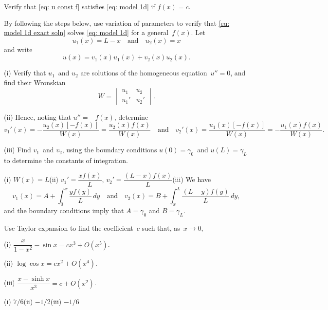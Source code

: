 \begin{example}
 
\end{example}

\begin{Exercises}

\exercise\label{ex: u const f}
Verify that \eqref{eq: u const f} satisfies \eqref{eq: model 1d} if $f(x)=c$.

\exercise\label{ex: variation of params}
By following the steps below, use variation of parameters to  verify that 
\eqref{eq: model 1d exact soln} solves \eqref{eq: model 1d} for a 
general~$f(x)$.  Let
\[
u_1(x)=L-x\quad\text{and}\quad u_2(x)=x
\]
and write
\[
u(x)=v_1(x)u_1(x)+v_2(x)u_2(x).
\]
\begin{description}
\item{(i)} Verify that $u_1$~and $u_2$ are solutions of the homogeneous 
equation~$u''=0$, and find their Wronskian
\[
W=\begin{vmatrix}u_1&u_2\\ u_1'&u_2' \end{vmatrix}.
\]
\item{(ii)} Hence, noting that $u''=-f(x)$, determine
\[
v_1'(x)=-\frac{u_2(x)[-f(x)]}{W(x)}=\frac{u_2(x)f(x)}{W(x)}
\quad\text{and}\quad
v_2'(x)=\frac{u_1(x)[-f(x)]}{W(x)}=-\frac{u_1(x)f(x)}{W(x)}.
\]
\item{(iii)}
Find $v_1$~and $v_2$, using the boundary conditions $u(0)=\gamma_0$~and 
$u(L)=\gamma_L$ to determine the constants of integration.
\end{description}
\begin{ans}
(i) $W(x)=L$\quad (ii) $v_1'=\dfrac{xf(x)}{L}$, 
$v_2'=\dfrac{(L-x)f(x)}{L}$\quad (iii) We have
\[
v_1(x)=A+\int_0^x\frac{yf(y)}{L}\,dy
\quad\text{and}\quad
v_2(x)=B+\int_x^L\frac{(L-y)f(y)}{L}\,dy,
\]
and the boundary conditions imply that $A=\gamma_0$ and $B=\gamma_L$.
\end{ans}


\exercise
Use Taylor expansion to find the coefficient~$c$ such that, as~$x\to0$,
\begin{description}
\item{(i)}
$\dfrac{x}{1-x^2}-\sin x=cx^3+O(x^5)$.
\item{(ii)}
$\log\cos x=cx^2+O(x^4)$.
\item{(iii)}
$\dfrac{x-\sinh x}{x^3}=c+O(x^2)$.
\end{description}
\begin{ans}
(i) $7/6$\quad (ii) $-1/2$\quad (iii) $-1/6$
\end{ans}


\end{Exercises}

